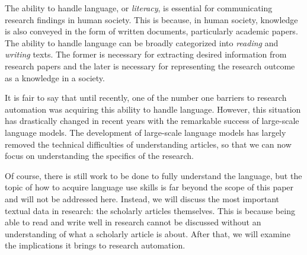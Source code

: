 The ability to handle language, or \textit{literacy}, is essential for communicating research findings in human society. This is because, in human society, knowledge is also conveyed in the form of written documents, particularly academic papers. The ability to handle language can be broadly categorized into \textit{reading} and \textit{writing} texts. The former is necessary for extracting desired information from research papers and the later is necessary for representing the research outcome as a knowledge in a society.

It is fair to say that until recently, one of the number one barriers to research automation was acquiring this ability to handle language. However, this situation has drastically changed in recent years with the remarkable success of large-scale language models. The development of large-scale language models has largely removed the technical difficulties of understanding articles, so that we can now focus on understanding the specifics of the research.

Of course, there is still work to be done to fully understand the language, but the topic of how to acquire language use skills is far beyond the scope of this paper and will not be addressed here. Instead, we will discuss the most important textual data in research: the scholarly articles themselves. This is because being able to read and write well in research cannot be discussed without an understanding of what a scholarly article is about. After that, we will examine the implications it brings to research automation.




